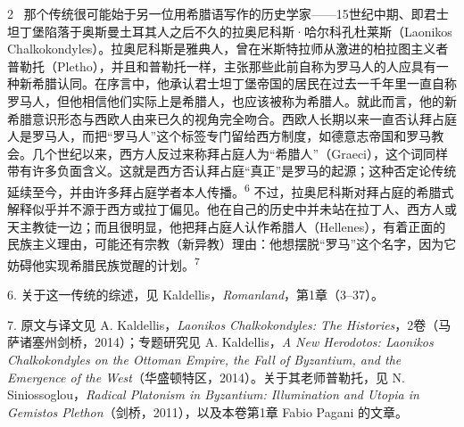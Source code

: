 \documentclass[10pt,a4paper]{article}
\begin{document}
\begin{paracol}{2}
\switchcolumn*
{\scriptsize\color{gray}[p. 352]}\ 那个传统很可能始于另一位用希腊语写作的历史学家——15世纪中期、即君士坦丁堡陷落于奥斯曼土耳其人之后不久的拉奥尼科斯·哈尔科孔杜莱斯（Laonikos Chalkokondyles）。拉奥尼科斯是雅典人，曾在米斯特拉师从激进的柏拉图主义者普勒托（Pletho），并且和普勒托一样，主张那些此前自称为罗马人的人应具有一种新希腊认同。在序言中，他承认君士坦丁堡帝国的居民在过去一千年里一直自称罗马人，但他相信他们实际上是希腊人，也应该被称为希腊人。就此而言，他的新希腊意识形态与西欧人由来已久的视角完全吻合。西欧人长期以来一直否认拜占庭人是罗马人，而把“罗马人”这个标签专门留给西方制度，如德意志帝国和罗马教会。几个世纪以来，西方人反过来称拜占庭人为“希腊人”（Graeci），这个词同样带有许多负面含义。这就是西方否认拜占庭“真正”是罗马的起源；这种否定论传统延续至今，并由许多拜占庭学者本人传播。\nobreak\textsuperscript{6} 不过，拉奥尼科斯对拜占庭的希腊式解释似乎并不源于西方或拉丁偏见。他在自己的历史中并未站在拉丁人、西方人或天主教徒一边；而且很明显，他把拜占庭人认作希腊人（Hellenes），有着正面的民族主义理由，可能还有宗教（新异教）理由：他想摆脱“罗马”这个名字，因为它妨碍他实现希腊民族觉醒的计划。\nobreak\textsuperscript{7}\par{\small 6. 关于这一传统的综述，见 Kaldellis，\textit{Romanland}，第1章（3–37）。\par}{\small 7. 原文与译文见 A. Kaldellis，\textit{Laonikos Chalkokondyles: The Histories}，2卷（马萨诸塞州剑桥，2014）；专题研究见 A. Kaldellis，\textit{A New Herodotos: Laonikos Chalkokondyles on the Ottoman Empire, the Fall of Byzantium, and the Emergence of the West}（华盛顿特区，2014）。关于其老师普勒托，见 N. Siniossoglou，\textit{Radical Platonism in Byzantium: Illumination and Utopia in Gemistos Plethon}（剑桥，2011），以及本卷第1章 Fabio Pagani 的文章。\par}
\switchcolumn

\end{paracol}
\end{document}
